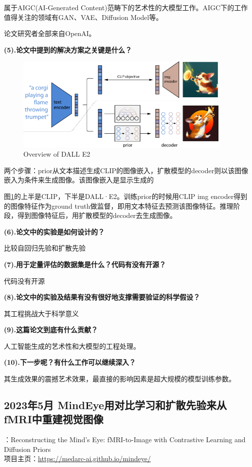 \documentclass[12pt, a4paper, oneside]{ctexart}
\begin{document}
    属于AIGC(AI-Generated Content)范畴下的艺术性的大模型工作。AIGC下的工作值得关注的领域有GAN、VAE、Diffusion Model等。

    论文研究者全部来自OpenAI。

    \noindent\textbf{(5).论文中提到的解决方案之关键是什么？}
    \begin{figure}[ptbp]
        \centering
        \includegraphics[width=0.95\textwidth]{pic/4.2_unCLIP.png}
        \caption{Overview of DALL E2}
        \label{overview_dalle2}
    \end{figure}

    两个步骤：prior从文本描述生成CLIP的图像嵌入，扩散模型的decoder则以该图像嵌入为条件来生成图像。该图像嵌入是显示生成的

    图\ref{overview_dalle2}的上半是CLIP，下半是DALL·E2。训练prior的时候用CLIP img encoder得到的图像特征作为ground truth做监督，即用文本特征去预测该图像特征。推理阶段，得到图像特征后，用扩散模型的decoder去生成图像。


    \noindent\textbf{(6).论文中的实验是如何设计的？}

    比较自回归先验和扩散先验

    \noindent\textbf{(7).用于定量评估的数据集是什么？代码有没有开源？}

    代码没有开源

    \noindent\textbf{(8).论文中的实验及结果有没有很好地支撑需要验证的科学假设？}

    其工程挑战大于科学意义

    \noindent\textbf{(9).这篇论文到底有什么贡献？}

    人工智能生成的艺术性和大模型的工程处理。

    \noindent\textbf{(10).下一步呢？有什么工作可以继续深入？}

    其生成效果的震撼艺术效果，最直接的影响因素是超大规模的模型训练参数。

    \subsection{2023年5月 MindEye用对比学习和扩散先验来从fMRI中重建视觉图像\cite{Scotti2023ReconstructingTM}}
    ：Reconstructing the Mind’s Eye: fMRI-to-Image with Contrastive Learning and Diffusion Priors\\
    项目主页：\url{https://medarc-ai.github.io/mindeye/}
\end{document}
